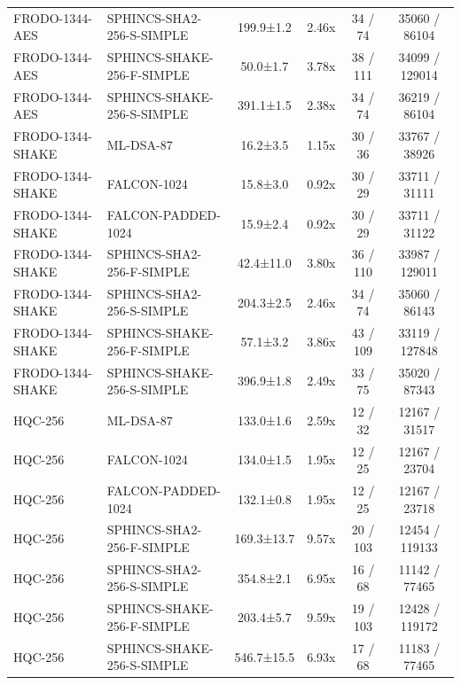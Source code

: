 \documentclass[10pt]{article}
\begin{document}
\begin{tabular}{@{}l l c c c c@{}}
FRODO-1344-AES & SPHINCS-SHA2-256-S-SIMPLE & 199.9±1.2 & 2.46x & 34 / 74 & 35060 / 86104 \\
FRODO-1344-AES & SPHINCS-SHAKE-256-F-SIMPLE & 50.0±1.7 & 3.78x & 38 / 111 & 34099 / 129014 \\
FRODO-1344-AES & SPHINCS-SHAKE-256-S-SIMPLE & 391.1±1.5 & 2.38x & 34 / 74 & 36219 / 86104 \\
FRODO-1344-SHAKE & ML-DSA-87 & 16.2±3.5 & 1.15x & 30 / 36 & 33767 / 38926 \\
FRODO-1344-SHAKE & FALCON-1024 & 15.8±3.0 & 0.92x & 30 / 29 & 33711 / 31111 \\
FRODO-1344-SHAKE & FALCON-PADDED-1024 & 15.9±2.4 & 0.92x & 30 / 29 & 33711 / 31122 \\
FRODO-1344-SHAKE & SPHINCS-SHA2-256-F-SIMPLE & 42.4±11.0 & 3.80x & 36 / 110 & 33987 / 129011 \\
FRODO-1344-SHAKE & SPHINCS-SHA2-256-S-SIMPLE & 204.3±2.5 & 2.46x & 34 / 74 & 35060 / 86143 \\
FRODO-1344-SHAKE & SPHINCS-SHAKE-256-F-SIMPLE & 57.1±3.2 & 3.86x & 43 / 109 & 33119 / 127848 \\
FRODO-1344-SHAKE & SPHINCS-SHAKE-256-S-SIMPLE & 396.9±1.8 & 2.49x & 33 / 75 & 35020 / 87343 \\
HQC-256 & ML-DSA-87 & 133.0±1.6 & 2.59x & 12 / 32 & 12167 / 31517 \\
HQC-256 & FALCON-1024 & 134.0±1.5 & 1.95x & 12 / 25 & 12167 / 23704 \\
HQC-256 & FALCON-PADDED-1024 & 132.1±0.8 & 1.95x & 12 / 25 & 12167 / 23718 \\
HQC-256 & SPHINCS-SHA2-256-F-SIMPLE & 169.3±13.7 & 9.57x & 20 / 103 & 12454 / 119133 \\
HQC-256 & SPHINCS-SHA2-256-S-SIMPLE & 354.8±2.1 & 6.95x & 16 / 68 & 11142 / 77465 \\
HQC-256 & SPHINCS-SHAKE-256-F-SIMPLE & 203.4±5.7 & 9.59x & 19 / 103 & 12428 / 119172 \\
HQC-256 & SPHINCS-SHAKE-256-S-SIMPLE & 546.7±15.5 & 6.93x & 17 / 68 & 11183 / 77465 \\
\bottomrule
\end{tabular}
\end{document}
